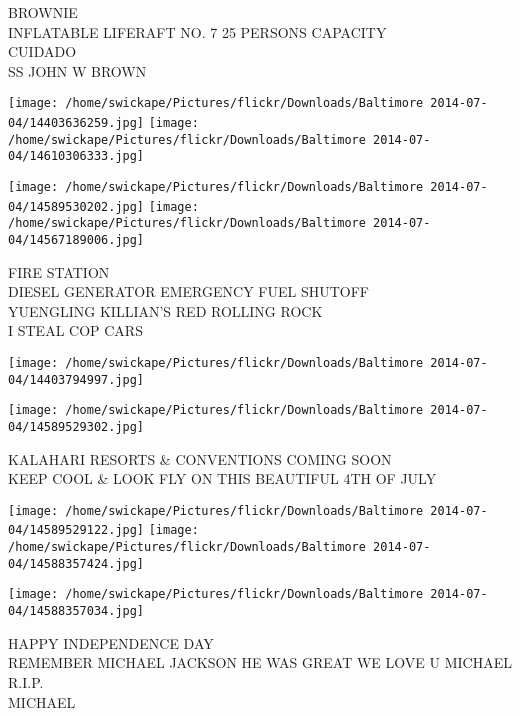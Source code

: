 \documentclass[10pt,letterpaper]{article}
\begin{document}
BROWNIE\\
INFLATABLE LIFERAFT NO. 7 25 PERSONS CAPACITY\\
CUIDADO\\
SS JOHN W BROWN
\pagebreak

\texttt{[image: /home/swickape/Pictures/flickr/Downloads/Baltimore 2014-07-04/14403636259.jpg]}
\texttt{[image: /home/swickape/Pictures/flickr/Downloads/Baltimore 2014-07-04/14610306333.jpg]}

\texttt{[image: /home/swickape/Pictures/flickr/Downloads/Baltimore 2014-07-04/14589530202.jpg]}
\texttt{[image: /home/swickape/Pictures/flickr/Downloads/Baltimore 2014-07-04/14567189006.jpg]}

FIRE STATION\\
DIESEL GENERATOR EMERGENCY FUEL SHUTOFF\\
YUENGLING KILLIAN'S RED ROLLING ROCK\\
I STEAL COP CARS
\pagebreak

\texttt{[image: /home/swickape/Pictures/flickr/Downloads/Baltimore 2014-07-04/14403794997.jpg]}

\vspace{0.25in}
\texttt{[image: /home/swickape/Pictures/flickr/Downloads/Baltimore 2014-07-04/14589529302.jpg]}

KALAHARI RESORTS \& CONVENTIONS COMING SOON\\
KEEP COOL \& LOOK FLY ON THIS BEAUTIFUL 4TH OF JULY
\pagebreak

\texttt{[image: /home/swickape/Pictures/flickr/Downloads/Baltimore 2014-07-04/14589529122.jpg]}
\texttt{[image: /home/swickape/Pictures/flickr/Downloads/Baltimore 2014-07-04/14588357424.jpg]}

\texttt{[image: /home/swickape/Pictures/flickr/Downloads/Baltimore 2014-07-04/14588357034.jpg]}

HAPPY INDEPENDENCE DAY\\
REMEMBER MICHAEL JACKSON HE WAS GREAT WE LOVE U MICHAEL R.I.P.\\
MICHAEL
\pagebreak
\end{document}
